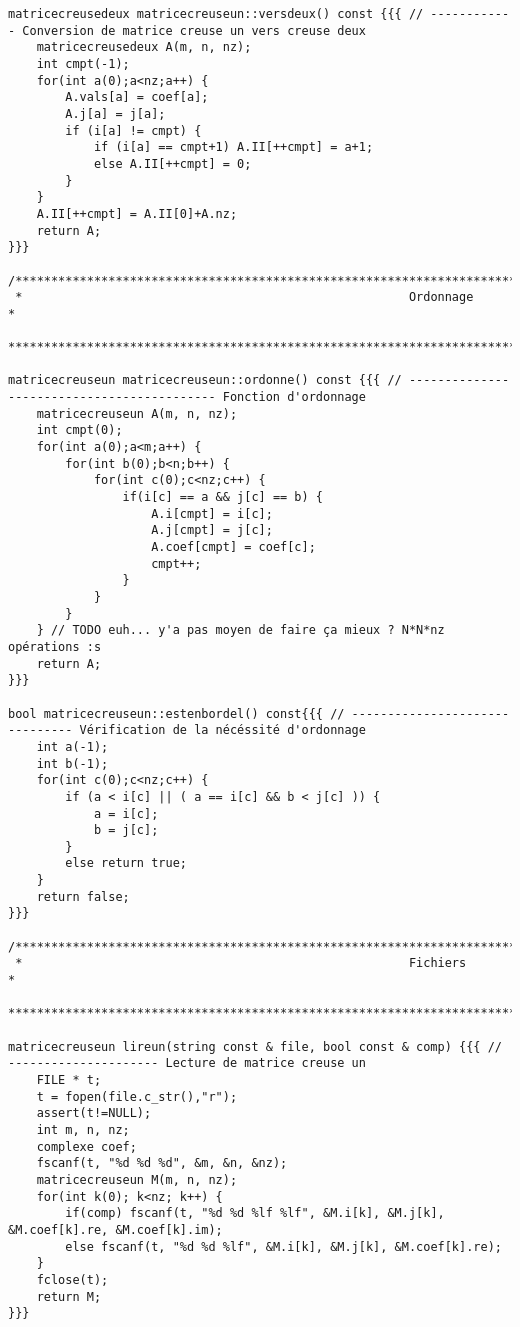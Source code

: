 \documentclass[a4paper]{article}
\begin{document}
\begin{verbatim}
matricecreusedeux matricecreuseun::versdeux() const {{{ // ------------ Conversion de matrice creuse un vers creuse deux
    matricecreusedeux A(m, n, nz);
    int cmpt(-1);
    for(int a(0);a<nz;a++) {
        A.vals[a] = coef[a];
        A.j[a] = j[a];
        if (i[a] != cmpt) {
            if (i[a] == cmpt+1) A.II[++cmpt] = a+1;
            else A.II[++cmpt] = 0; 
        }
    }
    A.II[++cmpt] = A.II[0]+A.nz;
    return A;
}}}

/**********************************************************************************************************************
 *                                                      Ordonnage                                                     *
 **********************************************************************************************************************/

matricecreuseun matricecreuseun::ordonne() const {{{ // ------------------------------------------- Fonction d'ordonnage
    matricecreuseun A(m, n, nz);
    int cmpt(0);
    for(int a(0);a<m;a++) {
        for(int b(0);b<n;b++) {
            for(int c(0);c<nz;c++) {
                if(i[c] == a && j[c] == b) {
                    A.i[cmpt] = i[c];
                    A.j[cmpt] = j[c];
                    A.coef[cmpt] = coef[c];
                    cmpt++;
                }
            }
        }
    } // TODO euh... y'a pas moyen de faire ça mieux ? N*N*nz opérations :s
    return A;
}}}

bool matricecreuseun::estenbordel() const{{{ // ------------------------------- Vérification de la nécéssité d'ordonnage
    int a(-1);
    int b(-1);
    for(int c(0);c<nz;c++) {
        if (a < i[c] || ( a == i[c] && b < j[c] )) {
            a = i[c];
            b = j[c];
        }
        else return true;
    }
    return false;
}}}

/**********************************************************************************************************************
 *                                                      Fichiers                                                      *
 **********************************************************************************************************************/

matricecreuseun lireun(string const & file, bool const & comp) {{{ // --------------------- Lecture de matrice creuse un
    FILE * t;
    t = fopen(file.c_str(),"r");
    assert(t!=NULL);
    int m, n, nz;
    complexe coef;
    fscanf(t, "%d %d %d", &m, &n, &nz);
    matricecreuseun M(m, n, nz);
    for(int k(0); k<nz; k++) {
        if(comp) fscanf(t, "%d %d %lf %lf", &M.i[k], &M.j[k], &M.coef[k].re, &M.coef[k].im);
        else fscanf(t, "%d %d %lf", &M.i[k], &M.j[k], &M.coef[k].re);
    }
    fclose(t);
    return M;
}}}


\end{verbatim}
\end{document}
